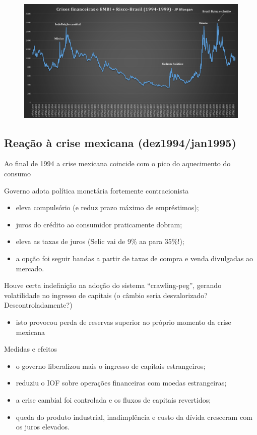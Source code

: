 \documentclass[a4paper,12pt]{article}[abntex2]
\begin{document}
\begin{figure}[H]
    \centering
    \includegraphics[width=0.7\linewidth]{Imagens/a15i2.png}
\end{figure}

\subsection{\textbf{Reação à crise mexicana (dez1994/jan1995)}}

Ao final de 1994 a crise mexicana coincide com o pico do aquecimento do consumo

Governo adota política monetária fortemente contracionista\begin{itemize}
    \item eleva compulsório (e reduz prazo máximo de empréstimos);
    \item juros do crédito ao consumidor praticamente dobram;
    \item eleva as taxas de juros (Selic vai de 9\% aa para 35\%!);
    \item a opção foi seguir bandas a partir de taxas de compra e venda divulgadas ao mercado.
\end{itemize}

Houve certa indefinição na adoção do sistema “crawling-peg”, gerando volatilidade no ingresso de capitais (o câmbio seria desvalorizado? Descontroladamente?)\begin{itemize}
    \item isto provocou perda de reservas superior ao próprio momento da crise mexicana
\end{itemize}

Medidas e efeitos\begin{itemize}
    \item o governo liberalizou mais o ingresso de capitais estrangeiros;
    \item reduziu o IOF sobre operações financeiras com moedas estrangeiras;
    \item a crise cambial foi controlada e os fluxos de capitais revertidos;
    \item queda do produto industrial, inadimplência e custo da dívida cresceram com os juros elevados.
\end{itemize}
\end{document}
